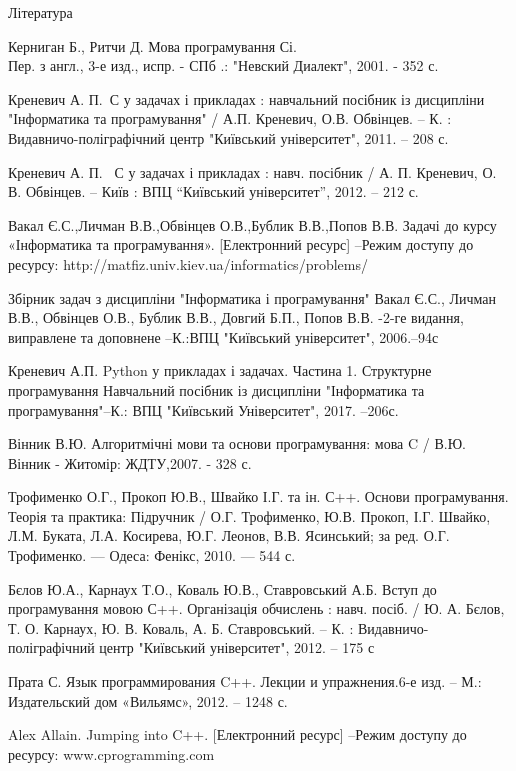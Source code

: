\documentclass[a5paper,titlepage,openany,twoside,
]
{book_unv}%
\begin{document}
\begin{thebibliography} {Література}

 Керниган Б., Ритчи Д. Мова програмування Сі.\\ Пер. з англ., 3-е изд., испр. - СПб .: "Невский Диалект", 2001. - 352 с. 

 Креневич А. П. С у задачах і прикладах : навчальний посібник із дисципліни "Інформатика та програмування" / А.П. Креневич, О.В. Обвінцев. – К. : Видавничо-поліграфічний центр "Київський університет", 2011. – 208 с.

Креневич А. П.  С у задачах і прикладах : навч. посібник / А. П. Креневич, О. В. Обвінцев. – Київ : ВПЦ “Київський університет”, 2012. – 212 с.

Вакал Є.С.,Личман В.В.,Обвінцев О.В.,Бублик В.В.,Попов В.В. Задачі до курсу «Інформатика та програмування». [Електронний ресурс] –Режим доступу до ресурсу: http://matfiz.univ.kiev.ua/informatics/problems/

Збірник задач з дисципліни "Інформатика і програмування" Вакал Є.С., Личман В.В., Обвінцев О.В., Бублик В.В., Довгий Б.П., Попов В.В. -2-ге видання, виправлене та доповнене –К.:ВПЦ "Київський університет", 2006.–94с

Креневич А.П. Python у прикладах і задачах. Частина 1. Структурне програмування Навчальний  посібник із дисципліни "Інформатика та програмування"–К.: ВПЦ "Київський Університет", 2017. –206с.

 Вінник В.Ю. Алгоритмічні мови та основи програмування: мова C / В.Ю. Вінник - Житомір: ЖДТУ,2007. - 328 с. 

Трофименко О.Г., Прокоп Ю.В., Швайко І.Г. та ін. С++. Основи програмування. Теорія та практика:
Підручник / О.Г. Трофименко, Ю.В. Прокоп, І.Г. Швайко, Л.М. Буката, Л.А. Косирева, Ю.Г. Леонов, В.В. Ясинський; за ред. О.Г. Трофименко. — Одеса: Фенікс, 2010. — 544 с.

Бєлов Ю.А., Карнаух Т.О., Коваль Ю.В., Ставровський А.Б. Вступ до програмування мовою С++. Організація обчислень :
навч. посіб. / Ю. А. Бєлов, Т. О. Карнаух, Ю. В. Коваль, А. Б. Ставровський. – 
К. : Видавничо-поліграфічний центр "Київський університет", 2012. – 175 с

Прата С. Язык программирования C++. Лекции и упражнения.6-е изд. – М.: Издательский дом «Вильямс», 2012. – 1248 с.

Alex Allain. Jumping into C++. [Електронний ресурс] –Режим доступу до ресурсу: www.cprogramming.com


\end{thebibliography}
\end{document}
